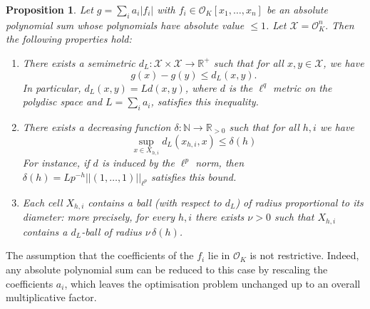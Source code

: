 \documentclass[10pt]{article}
\newtheorem{proposition}[theorem]{Proposition}
\theoremstyle{definition}
\newcommand{\RR}{\mathbb{R}}
\newcommand{\NN}{\mathbb{N}}
\begin{document}
\begin{proposition}
    \label{prop:doo-requirements}
    Let $g = \sum_i a_i \lvert f_i \rvert$ with $f_i\in \mathcal O_K[x_1,\dots,x_n]$ be an absolute polynomial sum whose polynomials have absolute value $\le 1$. Let $\mathcal X = \mathcal O_K^n.$
    Then the following properties hold:
    \begin{enumerate}
        \item[(i)] There exists a semimetric $d_L \colon \mathcal{X} \times \mathcal{X} \to \mathbb{R}^+$ such that for all $x, y \in \mathcal{X}$, we have 
        $$
            g(x) - g(y) \le d_L(x, y).
        $$
        In particular, $d_L(x, y) = L d(x, y)$, where $d$ is the $\ell^q$ metric on the polydisc space and 
        $
        L = \sum_i a_i 
        $, satisfies this inequality.
        \item[(ii)] There exists a decreasing function $\delta \colon \NN \to \RR_{>0}$ such that for all $h, i$ we have
        $$
            \sup_{x \in X_{h, i}} d_L(x_{h, i}, x) \le \delta(h)
        $$
        For instance, if $d$ is induced by the $\ell^p$ norm, then
        $
            \delta(h) = Lp^{-h} \lvert \lvert (1, \dotsc, 1) \rvert \rvert_{\ell^p}
        $
        satisfies this bound.
        \item[(iii)] Each cell $X_{h,i}$ contains a ball (with respect to $d_L$) of radius proportional to its diameter: more precisely, for every $h,i$ there exists $\nu > 0$ such that $X_{h,i}$ contains a $d_L$-ball of radius $\nu\,\delta(h)$.
    \end{enumerate}  
\end{proposition}

The assumption that the coefficients of the $f_i$ lie in $\mathcal{O}_K$ is not restrictive. Indeed, any absolute polynomial sum can be reduced to this case by rescaling the coefficients $a_i$, which leaves the optimisation problem unchanged up to an overall multiplicative factor.
\end{document}
